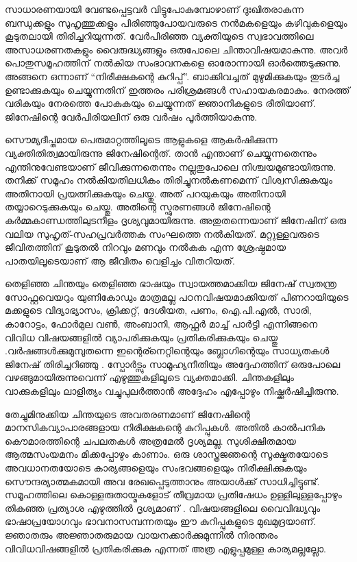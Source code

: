 \newpage
{}
സാധാരണയായി വേണ്ടപ്പെട്ടവര്‍ വിട്ടുപോകുമ്പോഴാണ് ദുഃഖിതരാകുന്ന ബന്ധുക്കളും സുഹൃത്തുക്കളും പിരിഞ്ഞുപോയവരുടെ നന്‍മകളെയും
കഴിവുകളെയും കൂടുതലായി തിരിച്ചറിയുന്നത്. വേര്‍പിരിഞ്ഞ വ്യക്തിയുടെ സ്വഭാവത്തിലെ അസാധരണതകളും വൈരുദ്ധ്യങ്ങളും ഒരുപോലെ
ചിന്താവിഷയമാകുന്നു. അവര്‍ പൊതുസമൂഹത്തിന് നല്‍കിയ സംഭാവനകളെ ഓരോന്നായി ഓര്‍ത്തെടുക്കുന്നു. അങ്ങനെ ഒന്നാണ്
``നിരീക്ഷകന്റെ കുറിപ്പ്''. ബാക്കിവച്ചത് മുഴുമിക്കുകയും തുടര്‍ച്ച ഉണ്ടാക്കുകയും ചെയ്യുന്നതിന് ഇത്തരം പരിശ്രമങ്ങള്‍ സഹായകരമാകും.
നേരത്ത് വരികയും നേരത്തെ പോകുകയും ചെയ്യുന്നത് ജ്ഞാനികളുടെ രീതിയാണ്. ജിനേഷിന്റെ വേര്‍പിരിയലിന് ഒരു വര്‍ഷം പൂര്‍ത്തിയാകുന്നു.

സൌമ്യദീപ്തമായ പെരുമാറ്റത്തിലൂടെ ആളുകളെ ആകര്‍ഷിക്കുന്ന വ്യക്തിതിത്വമായിരുന്നു ജിനേഷിന്റെത്. താന്‍ എന്താണ് ചെയ്യുന്നതെന്നും
എന്തിനുവേണ്ടയാണ് ജീവിക്കുന്നതെന്നും നല്ലതുപോലെ നിശ്ചയമുണ്ടായിരുന്നു. തനിക്ക് സമൂഹം നല്‍കിയതിലധികം തിരിച്ചുനല്‍കണമെന്ന്
വിശ്വസിക്കുകയും അതിനായി പ്രയത്നിക്കുകയും ചെയ്തു. അത് പറയുകയും അതിനായി തയ്യാറെടുക്കുകയും ചെയ്തു. അതിന്റെ സ്ഫുരണങ്ങള്‍
ജിനേഷിന്റെ കര്‍മ്മകാണ്ഡത്തിലുടനീളം ദൃശ്യവുമായിരുന്നു. അതുതന്നെയാണ് ജിനേഷിന് ഒരു വലിയ സുഹൃത്-സഹപ്രവര്‍ത്തക സംഘത്തെ
നല്‍കിയത്. മറ്റുള്ളവരുടെ ജീവിതത്തിന് കൂടുതല്‍ നിറവും മണവും നല്‍കുക എന്ന ശ്രേഷ്ഠമായ പാതയിലൂടെയാണ്  ആ ജീവിതം വെളിച്ചം വിതറിയത്.

തെളിഞ്ഞ ചിന്തയും തെളിഞ്ഞ ഭാഷയും സ്വായത്തമാക്കിയ ജിനേഷ് സ്വതന്ത്ര സോഫ്റ്റവെയറും യുണികോഡും മാത്രമല്ല പഠനവിഷയമാക്കിയത് 
പിണറായിയുടെ മക്കളുടെ വിദ്യാഭ്യാസം, ക്രിക്കറ്റ്, ദേശീയത, പണം, ഐ.പി.എല്‍, സാരി, കാറോട്ടം, ഫോര്‍മുല വണ്‍, അംബാനി, ആഫ്റ്റര്‍ 
മാച്ച് പാര്‍ട്ടി എന്നിങ്ങനെ വിവിധ വിഷയങ്ങളില്‍ വ്യാപരിക്കുകയും  പ്രതികരിക്കുകയും ചെയ്തു .വര്‍ഷങ്ങള്‍ക്കുമുമ്പുതന്നെ ഇന്റെര്നെറ്റിന്റെയും 
ബ്ലോഗിന്റെയും സാധ്യതകള്‍ ജിനേഷ് തിരിച്ചറിഞ്ഞു .  സ്പോര്‍ട്സും സാമൂഹ്യനീതിയും അദ്ദേഹത്തിന് ഒരുപോലെ വഴങ്ങുമായിരുന്നുവെന്ന് 
എഴുത്തുകളിലൂടെ വ്യക്തമാക്കി. ചിന്തകളിലും വാക്കുകളിലും ലാളിത്യം വച്ചുപുലര്‍ത്താന്‍ അദ്ദേഹം എപ്പോഴും നിഷ്ക്കര്‍ഷിച്ചിരുന്നു. 

തേച്ചുമിനുക്കിയ ചിന്തയുടെ അവതരണമാണ് ജിനേഷിന്റെ മാനസികവ്യാപാരങ്ങളായ നിരീക്ഷകന്റെ കുറിപ്പുകള്‍. അതില്‍ കാല്‍പനിക കൌമാരത്തിന്റെ 
ചപലതകള്‍ അത്രമേല്‍ ദൃശ്യമല്ല. സുശിക്ഷിതമായ ആത്മസംയമനം മിക്കപ്പോഴും കാണാം. ഒരു ശാസ്ത്രജഞന്റെ സൂക്ഷ്മതയോടെ അവധാനതയോടെ 
കാര്യങ്ങളെയും സംഭവങ്ങളെയും നിരീക്ഷിക്കുകയും സൌന്ദര്യാത്മകമായി അവ രേഖപ്പെടുത്താനും അയാള്‍ക്ക് സാധിച്ചിട്ടുണ്ട്. സമൂഹത്തിലെ 
കൊള്ളരുതായ്മകളോട് തീവ്രമായ പ്രതിഷേധം ഉള്ളിലുള്ളപ്പോഴും തികഞ്ഞ പ്രത്യാശ എഴുത്തില്‍ ദൃശ്യമാണ് . വിഷയങ്ങളിലെ വൈവിദ്ധ്യവും 
ഭാഷാപ്രയോഗവും ഭാവനാസമ്പന്നതയും ഈ കുറിപ്പുകളുടെ മുഖമുദ്രയാണ്. ജ്ഞാതരും അജ്ഞാതരുമായ വായനക്കാര്‍ക്കുമുന്നില്‍ നിരന്തരം 
വിവിധവിഷങ്ങളില്‍ പ്രതികരിക്കുക എന്നത് അത്ര എളുപ്പമുള്ള കാര്യമല്ലല്ലോ.

